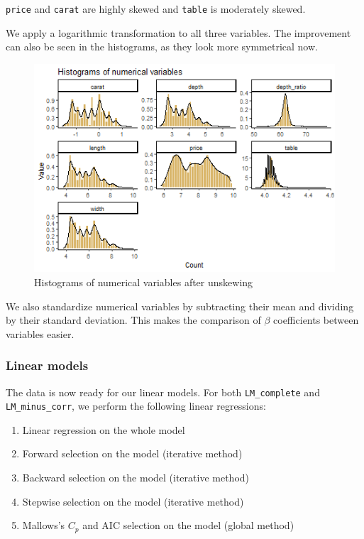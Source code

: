 \documentclass[
  paper=a4,
  ,captions=tableheading
]{scrartcl}
\providecommand{\tightlist}{%
  \setlength{\itemsep}{0pt}\setlength{\parskip}{0pt}}
\begin{document}
\texttt{price} and \texttt{carat} are highly skewed and \texttt{table}
is moderately skewed.

We apply a logarithmic transformation to all three variables. The
improvement can also be seen in the histograms, as they look more
symmetrical now.

\begin{figure}[H]

{\centering \includegraphics[width=\linewidth,]{Diamonds_PDF_files/figure-latex/hist-unskewed-1} 

}

\caption{Histograms of numerical variables after unskewing}\label{fig:hist-unskewed}
\end{figure}

We also standardize numerical variables by subtracting their mean and
dividing by their standard deviation. This makes the comparison of
\(\beta\) coefficients between variables easier.

\hypertarget{linear-models}{%
\subsubsection{Linear models}\label{linear-models}}

The data is now ready for our linear models. For both
\texttt{LM\_complete} and \texttt{LM\_minus\_corr}, we perform the
following linear regressions:

\begin{enumerate}
\def\labelenumi{\arabic{enumi}.}
\tightlist
\item
  Linear regression on the whole model
\item
  Forward selection on the model (iterative method)
\item
  Backward selection on the model (iterative method)
\item
  Stepwise selection on the model (iterative method)
\item
  Mallows's \(C_p\) and AIC selection on the model (global method)
\end{enumerate}
\end{document}
